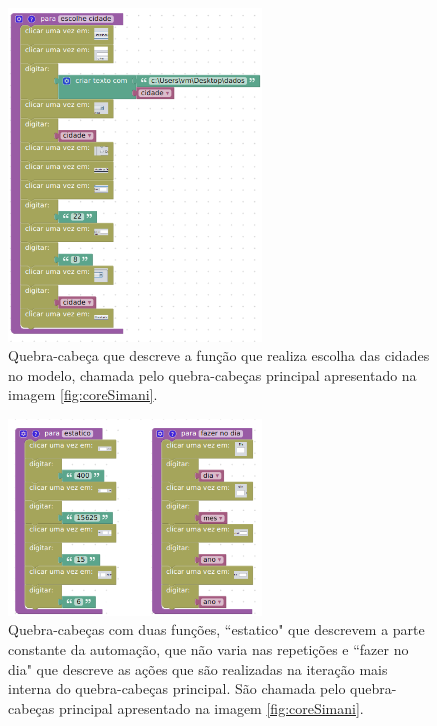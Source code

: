 \documentclass[tg]{mdtufsm}
\begin{document}
                    \begin{figure}[!htb]
                        {\centering
                        \includegraphics[width=0.6\textwidth]{imagens/EscolheCidade.png}
                        \caption{Quebra-cabeça que descreve a função que realiza escolha das cidades no modelo, chamada pelo quebra-cabeças principal apresentado na imagem \ref{fig:coreSimani}.}
                        \label{fig:EscolheCidade}}
                    \end{figure}

                    \begin{figure}[!htb]
                        {\centering
                        \includegraphics[width=0.6\textwidth]{imagens/estaticoDia.png}
                        \caption{Quebra-cabeças com duas funções, ``estatico" que descrevem a parte constante da automação, que não varia nas repetições e ``fazer no dia" que descreve as ações que são realizadas na iteração mais interna do quebra-cabeças principal. São chamada pelo quebra-cabeças principal apresentado na imagem \ref{fig:coreSimani}.}
                        \label{fig:estaticoDia}}
                    \end{figure}
\end{document}
